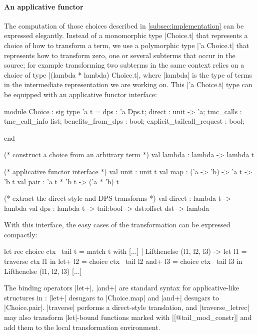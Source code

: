 \paragraph{An applicative functor}
\label{subsec:applicative-impl}

The computation of those choices described in \cref{subsec:implementation} can be expressed elegantly. Instead of a monomorphic type \ocaml|Choice.t| that represents a choice of how to transform a term, we use a polymorphic type \ocaml|'a Choice.t| that represents how to transform zero, one or several subterms that occur in the source; for example transforming two subterms in the same context relies on a choice of type \ocaml|(lambda * lambda) Choice.t|, where \ocaml|lambda| is the type of terms in the intermediate representation we are working on. This \ocaml|'a Choice.t| type can be equipped with an applicative functor interface:

\begin{minipage}{0.4\linewidth}
\begin{Ocaml}
module Choice : sig
  type 'a t = {
    dps : 'a Dps.t;
    direct : unit -> 'a;
    tmc_calls : tmc_call_info list;
    benefits_from_dps : bool;
    explicit_tailcall_request : bool;
  }





end
\end{Ocaml}
\end{minipage}
\hfill
\begin{minipage}{0.5\linewidth}
\begin{Ocaml}
  (* construct a choice from an arbitrary term *)
  val lambda : lambda -> lambda t

  (* applicative functor interface *)
  val unit : unit t
  val map : ('a -> 'b) -> 'a t -> 'b t
  val pair : 'a t * 'b t -> ('a * 'b) t

  (* extract the direct-style and DPS transforms *)
  val direct : lambda t -> lambda
  val dps :
    lambda t -> tail:bool -> dst:offset dst ->
    lambda
\end{Ocaml}
\end{minipage}

With this interface, the easy cases of the transformation can be expressed compactly:
\begin{Ocaml}
  let rec choice ctx ~tail t =
    match t with
    [...]
    | Lifthenelse (l1, l2, l3) ->
        let l1 = traverse ctx l1 in
        let+ l2 = choice ctx ~tail l2
        and+ l3 = choice ctx ~tail l3
        in Lifthenelse (l1, l2, l3)
    [...]
\end{Ocaml}
The binding operators \ocaml|let+|, \ocaml|and+| are standard syntax for applicative-like structures in \OCaml: \ocaml|let+| desugars to \ocaml|Choice.map| and \ocaml|and+| desugars to \ocaml|Choice.pair|. \ocaml|traverse| performs a direct-style translation, and \ocaml|traverse_letrec| may also transform \ocaml|let|-bound functions marked with \ocaml|[@tail_mod_constr]| and add them to the local transformation environment.

